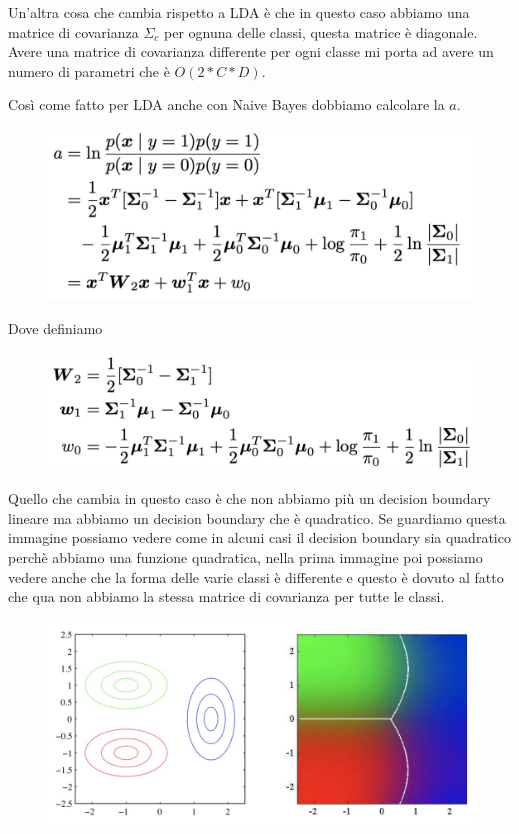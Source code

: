 \documentclass[14pt]{extreport}
\begin{document}
Un'altra cosa che cambia rispetto a LDA è che in questo caso abbiamo una matrice di covarianza $\Sigma_c$ per ognuna delle classi, questa matrice è
diagonale. Avere una matrice di covarianza differente per ogni classe mi porta ad avere un numero di parametri che è $O(2*C*D)$.

Così come fatto per LDA anche con Naive Bayes dobbiamo calcolare la $a$.

\begin{figure}[H]
	\centering
	\includegraphics[width=0.7\linewidth]{184.jpeg}
\end{figure}

Dove definiamo

\begin{figure}[H]
	\centering
	\includegraphics[width=0.7\linewidth]{185.jpeg}
\end{figure}

Quello che cambia in questo caso è che non abbiamo più un decision boundary lineare ma abbiamo un decision boundary che è quadratico. Se guardiamo
questa immagine possiamo vedere come in alcuni casi il decision boundary sia quadratico perchè abbiamo una funzione quadratica, nella prima immagine
poi possiamo vedere anche che la forma delle varie classi è differente e questo è dovuto al fatto che qua non abbiamo la stessa matrice di covarianza
per tutte le classi.

\begin{figure}[H]
	\centering
	\includegraphics[width=0.5\linewidth]{186.jpeg}
\end{figure}
\end{document}
